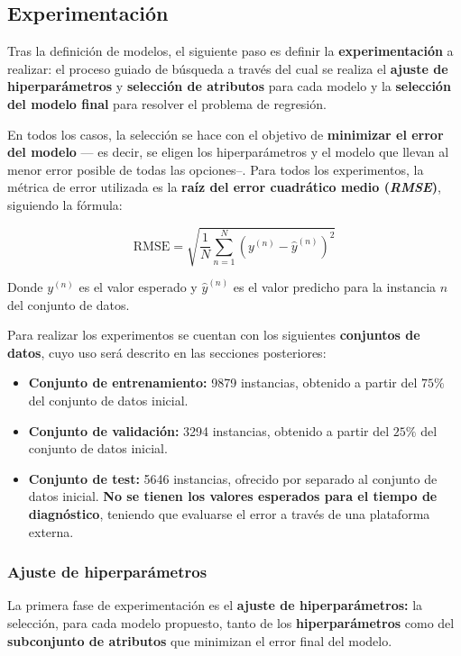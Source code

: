 \subsection{Experimentación}

Tras la definición de modelos, el siguiente paso es definir la \textbf{experimentación} a realizar: el proceso guiado de búsqueda a través del cual se realiza el \textbf{ajuste de hiperparámetros} y \textbf{selección de atributos} para cada modelo y la \textbf{selección del modelo final} para resolver el problema de regresión.

En todos los casos, la selección se hace con el objetivo de \textbf{minimizar el error del modelo} --- es decir, se eligen los hiperparámetros y el modelo que llevan al menor error posible de todas las opciones--. Para todos los experimentos, la métrica de error utilizada es la \textbf{raíz del error cuadrático medio (\textit{RMSE})}, siguiendo la fórmula:

$$\text{RMSE} = \sqrt{\frac{1}{N} \sum_{n=1}^{N}\left( y^{(n)} - \hat{y}^{(n)}\right)^2}$$

Donde $y^{(n)}$ es el valor esperado y $\hat{y}^{(n)}$ es el valor predicho para la instancia $n$ del conjunto de datos.

Para realizar los experimentos se cuentan con los siguientes \textbf{conjuntos de datos}, cuyo uso será descrito en las secciones posteriores:
\begin{itemize}[parsep=1pt, itemsep=1pt, topsep=4pt]
	\item \textbf{Conjunto de entrenamiento:} 9879 instancias, obtenido a partir del $75\%$ del conjunto de datos inicial.
	\item \textbf{Conjunto de validación:} 3294 instancias, obtenido a partir del $25\%$ del conjunto de datos inicial.
	\item \textbf{Conjunto de test:} 5646 instancias, ofrecido por separado al conjunto de datos inicial. \textbf{No se tienen los valores esperados para el tiempo de diagnóstico}, teniendo que evaluarse el error a través de una plataforma externa.
\end{itemize}

\subsubsection{Ajuste de hiperparámetros}

La primera fase de experimentación es el \textbf{ajuste de hiperparámetros:} la selección, para cada modelo propuesto, tanto de los \textbf{hiperparámetros} como del \textbf{subconjunto de atributos} que minimizan el error final del modelo. 

